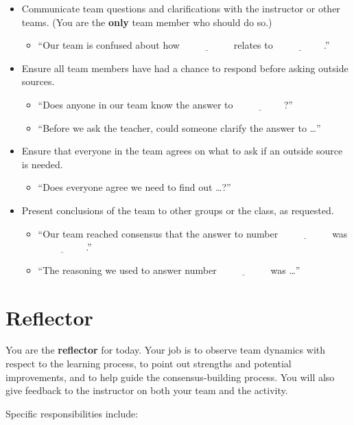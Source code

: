 \documentclass[12pt]{article}
\newcommand{\blank}{\ensuremath{\underline{\phantom{XXXXXX}}}\xspace}
\begin{document}
\begin{itemize}
\item Communicate team questions and clarifications with the instructor
  or other teams.  (You are the \textbf{only} team member who should
  do so.)
  \begin{itemize}
  \item ``Our team is confused about how \blank relates to \blank.''
  \end{itemize}
\item Ensure all team members have had a chance to respond before
  asking outside sources.
  \begin{itemize}
  \item ``Does anyone in our team know the answer to \blank?''
  \item ``Before we ask the teacher, could someone clarify the answer
    to \dots''
  \end{itemize}
\item Ensure that everyone in the team agrees on what to ask if an
  outside source is needed.
  \begin{itemize}
  \item ``Does everyone agree we need to find out \dots?''
  \end{itemize}
\item Present conclusions of the team to other groups or the class, as
  requested.
  \begin{itemize}
  \item ``Our team reached consensus that the answer to number \blank was \blank.''
  \item ``The reasoning we used to answer number \blank was \dots''
  \end{itemize}
\end{itemize}
\newpage
\section*{Reflector}

You are the \textbf{reflector} for today.  Your job is to observe team
dynamics with respect to the learning process, to point out strengths
and potential improvements, and to help guide the consensus-building
process.  You will also give feedback to the instructor on both your
team and the activity.

Specific responsibilities include:
\end{document}
